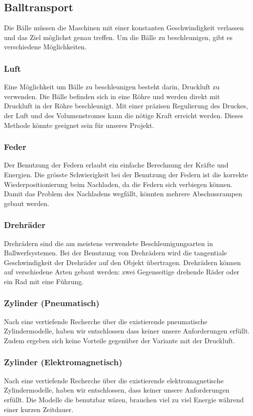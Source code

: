 \subsection{Balltransport}
Die Bälle müssen die Maschinen mit einer konstanten Geschwindigkeit verlassen und das Ziel möglichst genau treffen. Um die Bälle zu beschleunigen, gibt es verschiedene Möglichkeiten.
\subsubsection{Luft}
Eine Möglichkeit um Bälle zu beschleunigen besteht darin, Druckluft zu verwenden. Die Bälle befinden sich in eine Röhre und werden direkt mit Druckluft in der Röhre beschleunigt. Mit einer präzisen Regulierung des Druckes, der Luft und des Volumenstromes kann die nötige Kraft erreicht werden. Dieses Methode könnte geeignet sein für unseres Projekt.
\subsubsection{Feder}
Der Benutzung der Federn erlaubt ein einfache Berechnung der Kräfte und Energien. Die grösste Schwierigkeit bei der Benutzung der Federn ist die korrekte Wiederpositionierung beim Nachladen, da die Federn sich verbiegen können. Damit das Problem des Nachladens wegfällt, könnten mehrere Abschussrampen gebaut werden.
\subsubsection{Drehräder}
Drehrädern sind die am meistens verwendete Beschleunigungsarten in Ballwerfsystemen. Bei der Benutzung von Drehrädern wird die tangentiale Geschwindigkeit der Drehräder auf den Objekt übertragen. Drehrädern können auf verschiedene Arten gebaut werden: zwei Gegenseitige drehende Räder oder ein Rad mit eine Führung.
\subsubsection{Zylinder (Pneumatisch)}
Nach eine vertiefende Recherche über die existierende pneumatische Zylindermodelle, haben wir entschlossen dass keiner unsere Anforderungen erfüllt. Zudem ergeben sich keine Vorteile gegenüber der Variante mit der Druckluft.  
\subsubsection{Zylinder (Elektromagnetisch)}
Nach eine vertiefende Recherche über die existierende elektromagnetische Zylindermodelle, haben wir entschlossen, dass keiner unsere Anforderungen erfüllt. Die Modelle die benutzbar wären, brauchen viel zu viel Energie während einer kurzen Zeitdauer.